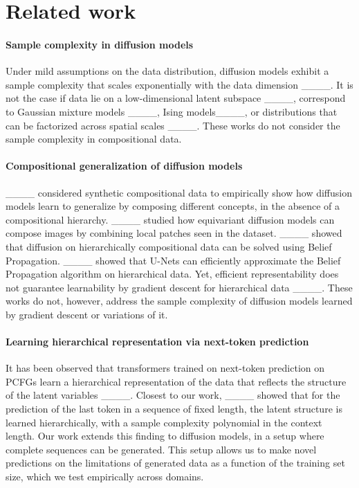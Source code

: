 \section{Related work}
\paragraph{Sample complexity in diffusion models}

Under mild assumptions on the data distribution, diffusion models exhibit a sample complexity that scales exponentially with the data dimension ____. It is not the case if data lie on a low-dimensional latent subspace ____, correspond to Gaussian mixture models ____, Ising models____, or distributions that can be factorized across spatial scales ____. These works do not consider the sample complexity in compositional data. 

\paragraph{Compositional generalization of diffusion models}

 ____ considered synthetic compositional data to empirically show how diffusion models learn to generalize by composing different concepts, in the absence of a compositional hierarchy. ____ studied how equivariant diffusion models can compose images by combining local patches seen in the dataset. ____ showed that diffusion on hierarchically compositional data can be solved using Belief Propagation. ____ showed that U-Nets can efficiently approximate the Belief Propagation algorithm on hierarchical data. Yet, efficient representability does not guarantee learnability by gradient descent for hierarchical data ____. These works do not, however, address the sample complexity of diffusion models learned by gradient descent or variations of it.

\paragraph{Learning hierarchical representation via next-token prediction}

It has been observed that transformers trained on next-token prediction on PCFGs learn a hierarchical representation of the data that reflects the structure of the latent variables ____. Closest to our work, ____ showed that for the prediction of the last token in a sequence of fixed length, the latent structure is learned hierarchically, with a sample complexity polynomial in the context length. Our work extends this finding to diffusion models, in a setup where complete sequences can be generated. This setup allows us to make novel predictions on the limitations of generated data as a function of the training set size, which we test empirically across domains.